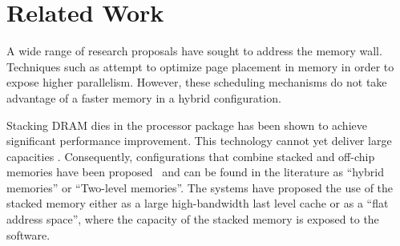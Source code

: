 
\section{Related Work}
\label{sec:Background}

A wide range of research proposals have sought to address the memory wall. 
Techniques such as \cite{BUMP,RMM,SUPERPAGES} attempt to optimize page placement in memory in order to expose higher parallelism. However, these scheduling mechanisms do not take advantage of a faster memory in a hybrid configuration.

Stacking DRAM dies in the processor package has been shown to achieve significant performance improvement. This technology cannot yet deliver large capacities \cite{JEDEC-HBM-REVISED}. Consequently, configurations that combine
stacked and off-chip memories have been proposed~\cite{LOH-HYBRID,qureshi-micro2012} and can be found in the literature as ``hybrid memories'' or ``Two-level memories''. The systems have proposed the use of the stacked memory
either as a large high-bandwidth last level cache or as a ``flat address space'', where the capacity of the stacked memory is exposed to the software.

